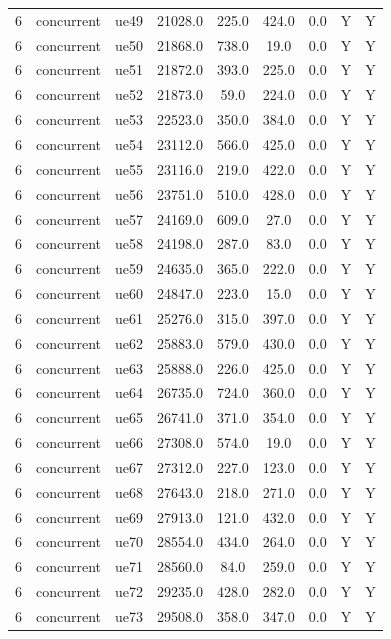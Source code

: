 \begin{table}[ht]
\begin{tabular}{|c|c|c|c|c|c|c|c|c|}
6 & concurrent & ue49 & 21028.0 & 225.0 & 424.0 & 0.0 & Y & Y \\
6 & concurrent & ue50 & 21868.0 & 738.0 & 19.0 & 0.0 & Y & Y \\
6 & concurrent & ue51 & 21872.0 & 393.0 & 225.0 & 0.0 & Y & Y \\
6 & concurrent & ue52 & 21873.0 & 59.0 & 224.0 & 0.0 & Y & Y \\
6 & concurrent & ue53 & 22523.0 & 350.0 & 384.0 & 0.0 & Y & Y \\
6 & concurrent & ue54 & 23112.0 & 566.0 & 425.0 & 0.0 & Y & Y \\
6 & concurrent & ue55 & 23116.0 & 219.0 & 422.0 & 0.0 & Y & Y \\
6 & concurrent & ue56 & 23751.0 & 510.0 & 428.0 & 0.0 & Y & Y \\
6 & concurrent & ue57 & 24169.0 & 609.0 & 27.0 & 0.0 & Y & Y \\
6 & concurrent & ue58 & 24198.0 & 287.0 & 83.0 & 0.0 & Y & Y \\
6 & concurrent & ue59 & 24635.0 & 365.0 & 222.0 & 0.0 & Y & Y \\
6 & concurrent & ue60 & 24847.0 & 223.0 & 15.0 & 0.0 & Y & Y \\
6 & concurrent & ue61 & 25276.0 & 315.0 & 397.0 & 0.0 & Y & Y \\
6 & concurrent & ue62 & 25883.0 & 579.0 & 430.0 & 0.0 & Y & Y \\
6 & concurrent & ue63 & 25888.0 & 226.0 & 425.0 & 0.0 & Y & Y \\
6 & concurrent & ue64 & 26735.0 & 724.0 & 360.0 & 0.0 & Y & Y \\
6 & concurrent & ue65 & 26741.0 & 371.0 & 354.0 & 0.0 & Y & Y \\
6 & concurrent & ue66 & 27308.0 & 574.0 & 19.0 & 0.0 & Y & Y \\
6 & concurrent & ue67 & 27312.0 & 227.0 & 123.0 & 0.0 & Y & Y \\
6 & concurrent & ue68 & 27643.0 & 218.0 & 271.0 & 0.0 & Y & Y \\
6 & concurrent & ue69 & 27913.0 & 121.0 & 432.0 & 0.0 & Y & Y \\
6 & concurrent & ue70 & 28554.0 & 434.0 & 264.0 & 0.0 & Y & Y \\
6 & concurrent & ue71 & 28560.0 & 84.0 & 259.0 & 0.0 & Y & Y \\
6 & concurrent & ue72 & 29235.0 & 428.0 & 282.0 & 0.0 & Y & Y \\
6 & concurrent & ue73 & 29508.0 & 358.0 & 347.0 & 0.0 & Y & Y \\

\end{tabular}
\end{table}
